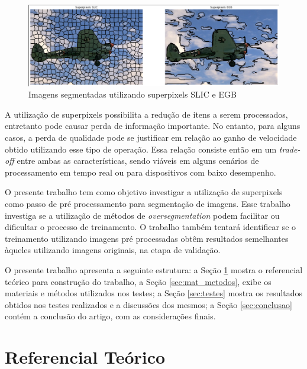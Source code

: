 \begin{document}
\begin{figure}[ht]
\centering
\includegraphics[width=1.\textwidth]{superpixels.png}
\caption{Imagens segmentadas utilizando superpixels SLIC e EGB}
\label{fig:superpixel}
\end{figure}

A utilização de superpixels possibilita a redução de itens a serem processados, entretanto pode causar perda de informação importante. No entanto, para alguns casos, a perda de qualidade pode se justificar em relação ao ganho de velocidade obtido utilizando esse tipo de operação. Essa relação consiste então em um \textit{trade-off} entre ambas as características, sendo viáveis em alguns cenários de processamento em tempo real ou para dispositivos com baixo desempenho.

O presente trabalho tem como objetivo investigar a utilização de superpixels como passo de pré processamento para segmentação de imagens. Esse trabalho investiga se a utilização de métodos de \textit{oversegmentation} podem facilitar ou dificultar o processo de treinamento. O trabalho também tentará identificar se o treinamento utilizando imagens pré processadas obtêm resultados semelhantes àqueles utilizando imagens originais, na etapa de validação.

O presente trabalho apresenta a seguinte estrutura: a Seção \ref{sec:ref_teorico} mostra o referencial teórico para construção do trabalho, a Seção  \ref{sec:mat_metodos}, exibe os materiais e métodos utilizados nos testes; a Seção \ref{sec:testes} mostra os resultados obtidos nos testes realizados e a discussões dos mesmos; a Seção \ref{sec:conclusao} contém a conclusão do artigo, com as considerações finais.



\section{Referencial Teórico} \label{sec:ref_teorico}
\end{document}
